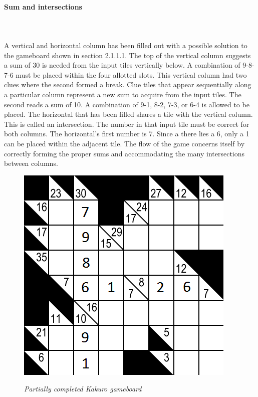 \documentclass[12pt]{article}
\begin{document}
\paragraph{Sum and intersections}\hfill\\ 
\hfill\\
A vertical and horizontal column has been filled out with a possible solution to the gameboard shown in section 2.1.1.1. The top of the vertical column suggests a sum of 30 is needed from the input tiles vertically below. A combination of 9-8-7-6 must be placed within the four allotted slots. This vertical column had two clues where the second formed a break. Clue tiles that appear sequentially along a particular column represent a new sum to acquire from the input tiles. The second reads a sum of 10. A combination of 9-1, 8-2, 7-3, or 6-4 is allowed to be placed. The horizontal that has been filled shares a tile with the vertical column. This is called an intersection. The number in that input tile must be correct for both columns. The horizontal's first number is 7. Since a there lies a 6, only a 1 can be placed within the adjacent tile. The flow of the game concerns itself by correctly forming the proper sums and accommodating the many intersections between columns.\\

\begin{figure}[htbp]
\centerline{\includegraphics[scale=.6]{gameboardpartial.png}}
\centerline{\textit {Partially completed Kakuro gameboard}}
\end{figure}
\end{document}
